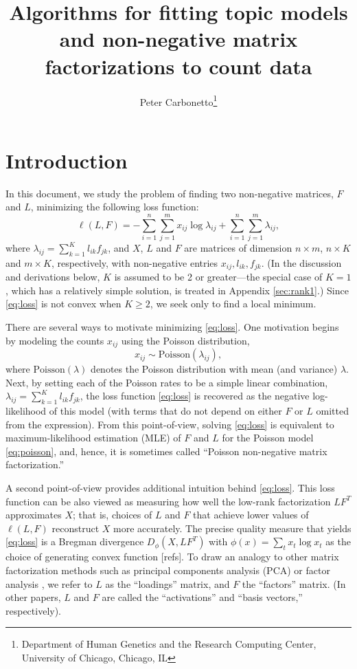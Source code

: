 \documentclass[final]{siamart171218}
\title{Algorithms for fitting topic models and non-negative matrix 
  factorizations to count data}
\author{Peter Carbonetto\thanks{Department of Human Genetics and the 
  Research Computing Center, University of Chicago, Chicago, IL}}
\begin{document}
\maketitle

\section{Introduction}
In this document, we study the problem of finding two non-negative
matrices, $F$ and $L$, minimizing the following loss function:
\begin{equation}
\ell(L,F) = 
-\sum_{i=1}^n \sum_{j=1}^m x_{ij} \log \lambda_{ij} + 
\sum_{i=1}^n \sum_{j=1}^m \lambda_{ij},
\label{eq:loss}
\end{equation}
where $\lambda_{ij} = \sum_{k=1}^K l_{ik} f_{jk}$, and $X$, $L$ and
$F$ are matrices of dimension $n \times m$, $n \times K$ and $m \times
K$, respectively, with non-negative entries $x_{ij}, l_{ik}, f_{jk}$.
(In the discussion and derivations below, $K$ is assumed to be 2 or
greater---the special case of $K = 1$, which has a relatively simple
solution, is treated in Appendix \ref{sec:rank1}.) Since \eqref{eq:loss}
is not convex when $K \geq 2$, we seek only to find a local minimum.

There are several ways to motivate minimizing \eqref{eq:loss}. One
motivation begins by modeling the counts $x_{ij}$ using the Poisson
distribution,
\begin{equation}
x_{ij} \sim \mathrm{Poisson}(\lambda_{ij}),
\label{eq:poisson}
\end{equation}
where $\mathrm{Poisson}(\lambda)$ denotes the Poisson distribution
with mean (and variance) $\lambda$. Next, by setting each of the
Poisson rates to be a simple linear combination, $\lambda_{ij} =
\sum_{k=1}^K l_{ik} f_{jk}$, the loss function \eqref{eq:loss} is
recovered as the negative log-likelihood of this model (with terms
that do not depend on either $F$ or $L$ omitted from the
expression). From this point-of-view, solving \eqref{eq:loss} is
equivalent to maximum-likelihood estimation (MLE) of $F$ and $L$ for
the Poisson model \eqref{eq:poisson}, and, hence, it is sometimes called
``Poisson non-negative matrix factorization.''

A second point-of-view provides additional intuition behind
\eqref{eq:loss}. This loss function can be also viewed as measuring
how well the low-rank factorization $LF^T$ approximates $X$; that is,
choices of $L$ and $F$ that achieve lower values of $\ell(L,F)$
reconstruct $X$ more accurately. The precise quality measure that
yields \eqref{eq:loss} is a Bregman divergence $D_{\phi}(X, LF^T)$
\cite{bregman-1967} with $\phi(x) = \sum_t x_t \log x_t$ as the choice
of generating convex function [refs]. To draw an analogy to other
matrix factorization methods such as principal components analysis
(PCA) or factor analysis \cite{engelhardt-stephens-2010}, we refer to
$L$ as the ``loadings'' matrix, and $F$ the ``factors'' matrix. (In
other papers, $L$ and $F$ are called the ``activations'' and ``basis
vectors,'' respectively).
\end{document}
